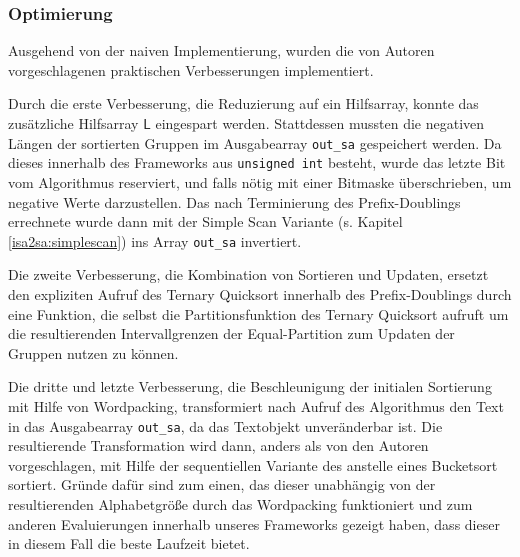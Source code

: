 \subsubsection{Optimierung}
Ausgehend von der naiven Implementierung, wurden die von Autoren vorgeschlagenen praktischen Verbesserungen implementiert. 

Durch die erste Verbesserung, die Reduzierung auf ein Hilfsarray, konnte das zusätzliche Hilfsarray $\mathsf{L}$ eingespart werden. Stattdessen mussten die negativen Längen der sortierten Gruppen im Ausgabearray \texttt{out_sa} gespeichert werden. Da dieses innerhalb des Frameworks aus \texttt{unsigned int} besteht, wurde das letzte Bit vom Algorithmus reserviert, und falls nötig mit einer Bitmaske überschrieben, um \glqq negative\grqq{} Werte darzustellen. Das nach Terminierung des Prefix-Doublings errechnete \isa wurde dann mit der Simple Scan Variante (s. Kapitel \ref{isa2sa:simplescan}) ins Array \texttt{out_sa} invertiert. 

Die zweite Verbesserung, die Kombination von Sortieren und Updaten, ersetzt den expliziten Aufruf des Ternary Quicksort innerhalb des Prefix-Doublings durch eine Funktion, die selbst die Partitionsfunktion des Ternary Quicksort aufruft um die resultierenden Intervallgrenzen der Equal-Partition zum Updaten der Gruppen nutzen zu können.

Die dritte und letzte Verbesserung, die Beschleunigung der initialen Sortierung mit Hilfe von Wordpacking, transformiert nach Aufruf des Algorithmus den Text in das Ausgabearray \texttt{out_sa}, da das Textobjekt unveränderbar ist. Die resultierende Transformation wird dann, anders als von den Autoren vorgeschlagen, mit Hilfe der sequentiellen Variante des \ipsviero anstelle eines Bucketsort sortiert. Gründe dafür sind zum einen, das dieser unabhängig von der resultierenden Alphabetgröße durch das Wordpacking funktioniert und zum anderen Evaluierungen innerhalb unseres Frameworks gezeigt haben, dass dieser in diesem Fall die beste Laufzeit bietet.
